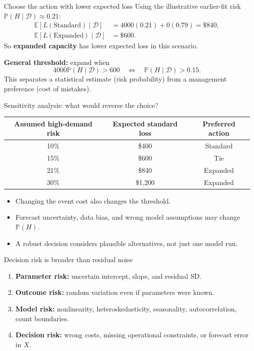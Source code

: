 \documentclass[aspectratio=43,11pt]{beamer}
\newcommand{\E}{\mathbb{E}}
\newcommand{\Prob}{\mathbb{P}}
\newcommand{\dd}{\mathcal D}
\begin{document}
\begin{frame}{Choose the action with lower expected loss}
Using the illustrative earlier-fit risk $\Prob(H\mid\dd)\approx0.21$:
\begin{align*}
\E[L(\text{Standard})\mid\dd]&=4000(0.21)+0(0.79)=\$840,\\
\E[L(\text{Expanded})\mid\dd]&=\$600.
\end{align*}
So \textbf{expanded capacity} has lower expected loss in this scenario.
\par\medskip\textbf{General threshold:} expand when
\[4000\Prob(H\mid\dd)>600\quad\Longleftrightarrow\quad \Prob(H\mid\dd)>0.15.\]
This separates a statistical estimate (risk probability) from a management preference (cost of mistakes).
\end{frame}

\begin{frame}{Sensitivity analysis: what would reverse the choice?}
\small
\begin{tabular}{c|c|c}
\toprule Assumed high-demand risk & Expected standard loss & Preferred action\\\midrule
10\% & \$400 & Standard\\
15\% & \$600 & Tie\\
21\% & \$840 & Expanded\\
30\% & \$1,200 & Expanded\\\bottomrule
\end{tabular}
\vspace{.4cm}
\begin{itemize}
\item Changing the event cost also changes the threshold.
\item Forecast uncertainty, data bias, and wrong model assumptions may change $\Prob(H)$.
\item A robust decision considers plausible alternatives, not just one model run.
\end{itemize}
\end{frame}

\begin{frame}{Decision risk is broader than residual noise}
\begin{enumerate}
\item \textbf{Parameter risk:} uncertain intercept, slope, and residual SD.
\item \textbf{Outcome risk:} random variation even if parameters were known.
\item \textbf{Model risk:} nonlinearity, heteroskedasticity, seasonality, autocorrelation, count boundaries.
\item \textbf{Decision risk:} wrong costs, missing operational constraints, or forecast error in $X$.
\end{enumerate}
\end{frame}
\end{document}
